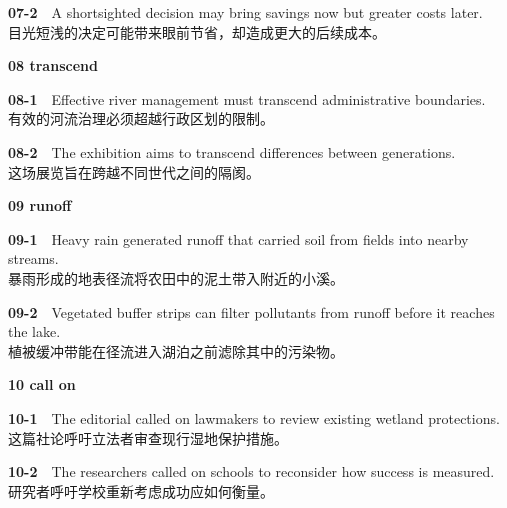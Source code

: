 \documentclass[a4paper,11pt,openany]{report}
\newcommand{\zhline}[1]{{\CJKsf\color{bodygrey}#1}}
\begin{document}
\begin{samepage}
\textbf{07-2}　A shortsighted decision may bring savings now but greater costs later.\\
\zhline{目光短浅的决定可能带来眼前节省，却造成更大的后续成本。}
\par\end{samepage}

\textbf{08 transcend}

\begin{samepage}
\textbf{08-1}　Effective river management must transcend administrative boundaries.\\
\zhline{有效的河流治理必须超越行政区划的限制。}
\par\end{samepage}

\begin{samepage}
\textbf{08-2}　The exhibition aims to transcend differences between generations.\\
\zhline{这场展览旨在跨越不同世代之间的隔阂。}
\par\end{samepage}

\textbf{09 runoff}

\begin{samepage}
\textbf{09-1}　Heavy rain generated runoff that carried soil from fields into nearby streams.\\
\zhline{暴雨形成的地表径流将农田中的泥土带入附近的小溪。}
\par\end{samepage}

\begin{samepage}
\textbf{09-2}　Vegetated buffer strips can filter pollutants from runoff before it reaches the lake.\\
\zhline{植被缓冲带能在径流进入湖泊之前滤除其中的污染物。}
\par\end{samepage}

\textbf{10 call on}

\begin{samepage}
\textbf{10-1}　The editorial called on lawmakers to review existing wetland protections.\\
\zhline{这篇社论呼吁立法者审查现行湿地保护措施。}
\par\end{samepage}

\begin{samepage}
\textbf{10-2}　The researchers called on schools to reconsider how success is measured.\\
\zhline{研究者呼吁学校重新考虑成功应如何衡量。}
\par\end{samepage}
\end{document}
